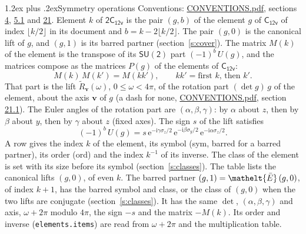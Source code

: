 \documentclass[10pt,a4paper]{article}
\makeatletter
\renewcommand\section{\@startsection{section}{1}{\z@}{-3ex plus -1ex minus -.2ex}%
  {1.2ex plus .2ex}{\normalfont\large\sffamily\bfseries\color{parttitle}}}
\numberwithin{equation}{section}
\newcommand{\eltfont}[1]{{\let\sigma\eltsigma\mathelt{#1}}}
\newcommand{\grp}[1]{\mathsf{#1}}
\newcommand{\elt}[1]{\eltfont{#1}}
\newcommand{\vv}{\mathbf{v}}
\newcommand{\iunit}{\mathrm{i}}
\newcommand{\expe}{\mathrm{e}}
\newcommand{\barred}[1]{\bar{#1}}
\newcommand{\lift}[1]{\tilde{#1}}
\newcommand{\pauli}[1]{\sigma_{#1}}
\makeatother
\begin{document}
\section{Symmetry operations}\label{s:elements}
Conventions: \href{../../CONVENTIONS.pdf}{CONVENTIONS.pdf}, sections \href{../../../rotation/CONVENTIONS.pdf\#conv.4}{4}, \href{../../../rotation/CONVENTIONS.pdf\#conv.5.1}{5.1} and \href{../../CONVENTIONS.pdf\#conv.21}{21}.
\leavevmode\label{n:index.element}\label{n:element.g}Element $k$ of $\grp{2C_{12v}}$ is the pair $(g, b)$ of the element $g$ of \href{../../../rotation/data/pdf/C12v.pdf}{$\grp{C_{12v}}$} of index $\lfloor k/2\rfloor$ in its document and $b = k - 2\lfloor k/2\rfloor$. The pair $(g, 0)$ is the canonical lift of $g$, and $(g, 1)$ is its barred partner (section~\ref{s:cover}). \label{n:matrix.element.pin}\label{n:matrix.element}The matrix $M(k)$ of the element is the transpose of its $\grp{SU(2)}$ part $(-1)^{b}\,U(g)$, and the matrices compose as the matrices $P(g)$ of the elements of $\grp{C_{12v}}$:
\begin{equation}\label{e:mprod}M(k)\,M(k') = M(kk'),\qquad kk' = \text{first } k\text{, then } k'.\end{equation}
\leavevmode\label{n:angle.omega}\label{n:vector.axis}\label{n:vector.pole}That part is the lift $\lift{R}_{\vv}(\omega)$, $0 \le \omega < 4\pi$, of the rotation part $(\det g)\,g$ of the element, about the axis $\vv$ of $g$ (a dash for none, \href{../../CONVENTIONS.pdf}{CONVENTIONS.pdf}, section \href{../../CONVENTIONS.pdf\#conv.21.1}{21.1}). \label{n:angle.euler.alpha}\label{n:angle.euler.beta}\label{n:angle.euler.gamma}\label{n:vector.coordinates}The Euler angles of the rotation part are $(\alpha,\beta,\gamma)$: by $\alpha$ about $z$, then by $\beta$ about $y$, then by $\gamma$ about $z$ (fixed axes). \label{n:local.euler.sign}The sign $s$ of the lift satisfies
\begin{equation}\label{e:euler}(-1)^{b}\,U(g) = s\,\expe^{-\iunit\gamma\pauli{z}/2}\,\expe^{-\iunit\beta\pauli{y}/2}\,\expe^{-\iunit\alpha\pauli{z}/2}.\end{equation}
\leavevmode\label{n:index.element.inverse}\label{n:head.sym}\label{n:head.ord}A row gives the index $k$ of the element, its symbol (sym, barred for a barred partner), its order (ord) and the index $k^{-1}$ of its inverse. \label{n:head.class}The class of the element is set with its size before its symbol (section~\ref{s:classes}).
The table lists the canonical lifts $(g, 0)$, of even $k$. The barred partner $(g, 1) = \elt{\barred{E}}\,(g, 0)$, of index $k + 1$, has the barred symbol and class, or the class of $(g, 0)$ when the two lifts are conjugate (section~\ref{s:classes}). It has the same $\det$, $(\alpha,\beta,\gamma)$ and axis, $\omega + 2\pi$ modulo $4\pi$, the sign $-s$ and the matrix $-M(k)$. Its order and inverse (\texttt{elements.items}) are read from $\omega + 2\pi$ and the multiplication table.
\end{document}
